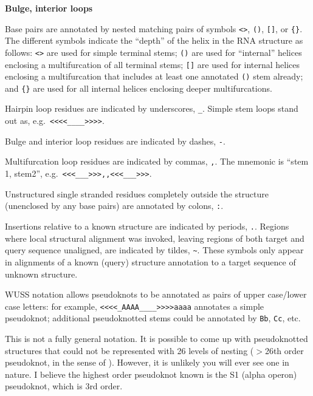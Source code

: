 \begin{sreitems}{\textbf{Bulge, interior loops}}
\item[\textbf{Base pairs}]
  Base pairs are annotated by nested matching pairs of symbols
  \verb+<>+, \verb+()+, \verb+[]+, or \verb+{}+.
  The different symbols indicate the ``depth'' of the
  helix in the RNA structure as follows:
  \verb+<>+ are used for simple terminal stems;
  \verb+()+ are used for ``internal'' helices enclosing a multifurcation of
  all terminal stems; \verb+[]+ are used for internal helices
  enclosing a multifurcation that includes at least one annotated
  \verb+()+ stem already; and \verb+{}+ are used for all internal
  helices enclosing deeper multifurcations.

\item[\textbf{Hairpin loops}]
  Hairpin loop residues are indicated by underscores, \verb+_+.
  Simple stem loops stand out as, e.g.\ \verb+<<<<____>>>>+.

\item[\textbf{Bulge, interior loops}]
  Bulge and interior loop residues are indicated by dashes, \verb+-+.

\item[\textbf{Multifurcation loops}]
  Multifurcation loop residues are indicated by commas, \verb+,+.
  The mnemonic is ``stem 1, stem2'', e.g.\ \verb+<<<___>>>,,<<<___>>>+.

\item[\textbf{External residues}]
  Unstructured single stranded residues completely outside the
  structure (unenclosed by any base pairs) are annotated by
  colons, \verb+:+.

\item[\textbf{Insertions}]
  Insertions relative to a known structure are indicated by periods,
  \verb+.+. Regions where local structural alignment was invoked,
  leaving regions of both target and query sequence unaligned,
  are indicated by tildes, \verb+~+. These symbols only appear in
  alignments of a known (query) structure annotation to a target
  sequence of unknown structure.

\item[\textbf{Pseudoknots}]
  WUSS notation allows pseudoknots to be annotated as pairs of
  upper case/lower case letters: for example,
  \verb+<<<<_AAAA____>>>>aaaa+ annotates a simple pseudoknot;
  additional pseudoknotted stems could be annotated by \verb+Bb+,
  \verb+Cc+, etc. 

  This is not a fully general notation. It is possible to come up with
  pseudoknotted structures that could not be represented with 26
  levels of nesting ($>$26th order pseudoknot, in the sense of
  \citep{RivasEddy99}). However, it is unlikely you will ever see one
  in nature. I believe the highest order pseudoknot known is the S1
  (alpha operon) pseudoknot, which is 3rd order.
\end{sreitems}

